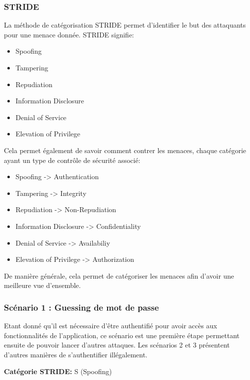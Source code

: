 \documentclass{article}
\begin{document}
\subsubsection{STRIDE}

La méthode de catégorisation STRIDE permet d'identifier le but des
attaquants pour une menace donnée. STRIDE signifie:

\begin{itemize}

\item
  Spoofing
\item
  Tampering
\item
  Repudiation
\item
  Information Disclosure
\item
  Denial of Service
\item
  Elevation of Privilege
\end{itemize}

Cela permet également de savoir comment contrer les menaces, chaque
catégorie ayant un type de contrôle de sécurité associé:

\begin{itemize}

\item
  Spoofing -\textgreater{} Authentication
\item
  Tampering -\textgreater{} Integrity
\item
  Repudiation -\textgreater{} Non-Repudiation
\item
  Information Disclosure -\textgreater{} Confidentiality
\item
  Denial of Service -\textgreater{} Availabiliy
\item
  Elevation of Privilege -\textgreater{} Authorization
\end{itemize}

De manière générale, cela permet de catégoriser les menaces afin d'avoir
une meilleure vue d'ensemble.

\subsubsection{Scénario 1 : Guessing de mot de passe}

Etant donné qu'il est nécessaire d'être authentifié pour avoir accès aux
fonctionnalités de l'application, ce scénario est une première étape
permettant ensuite de pouvoir lancer d'autres attaques. Les scénarios 2
et 3 présentent d'autres manières de s'authentifier illégalement.

\textbf{Catégorie STRIDE:} S (Spoofing)
\end{document}

